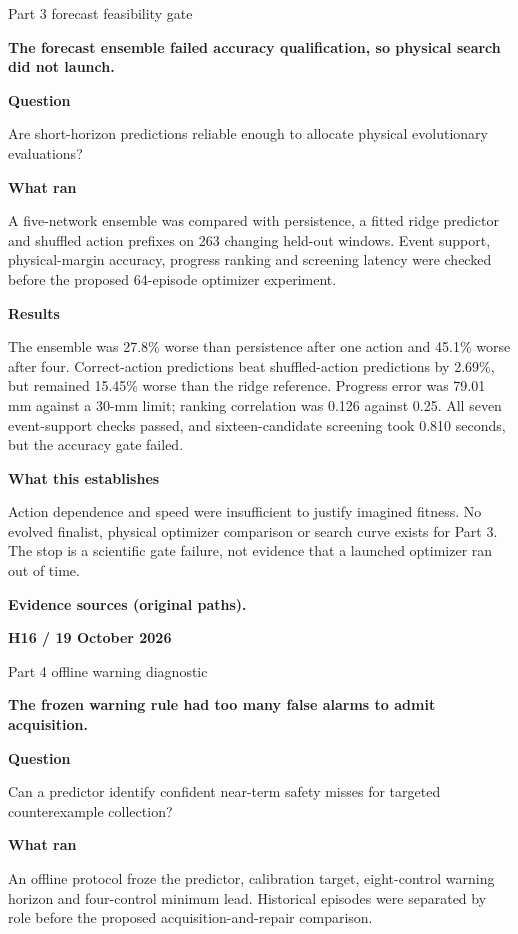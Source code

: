 \documentclass[11pt,a4paper]{article}
\newcommand{\block}[2]{\par\textbf{\color{ink}#1}\par\nopagebreak #2\par}
\newcommand{\finding}[1]{\begin{tcolorbox}[colback=pale,colframe=pale,boxrule=0pt,arc=1mm,left=10pt,right=10pt,top=10pt,bottom=10pt]\color{ink}\large\bfseries #1\end{tcolorbox}}
\begin{document}
\par
{\color{muted}\small Part 3 forecast feasibility gate}\par\vspace{2mm}
\finding{The forecast ensemble failed accuracy qualification, so physical search did not launch.}
\block{Question}{Are short-horizon predictions reliable enough to allocate physical evolutionary evaluations?}
\block{What ran}{A five-network ensemble was compared with persistence, a fitted ridge predictor and shuffled action prefixes on 263 changing held-out windows. Event support, physical-margin accuracy, progress ranking and screening latency were checked before the proposed 64-episode optimizer experiment.}
\block{Results}{The ensemble was 27.8\% worse than persistence after one action and 45.1\% worse after four. Correct-action predictions beat shuffled-action predictions by 2.69\%, but remained 15.45\% worse than the ridge reference. Progress error was 79.01 mm against a 30-mm limit; ranking correlation was 0.126 against 0.25. All seven event-support checks passed, and sixteen-candidate screening took 0.810 seconds, but the accuracy gate failed.}
\block{What this establishes}{Action dependence and speed were insufficient to justify imagined fitness. No evolved finalist, physical optimizer comparison or search curve exists for Part 3. The stop is a scientific gate failure, not evidence that a launched optimizer ran out of time.}
\vfill{\footnotesize\color{muted}\textbf{Evidence sources (original paths).}\par
\raggedright {}}
\clearpage
{}\label{exp:H16}
{\color{accent}\small\bfseries H16 / 19 October 2026}\par
{}\par
{\color{muted}\small Part 4 offline warning diagnostic}\par\vspace{2mm}
\finding{The frozen warning rule had too many false alarms to admit acquisition.}
\block{Question}{Can a predictor identify confident near-term safety misses for targeted counterexample collection?}
\block{What ran}{An offline protocol froze the predictor, calibration target, eight-control warning horizon and four-control minimum lead. Historical episodes were separated by role before the proposed acquisition-and-repair comparison.}
\end{document}
